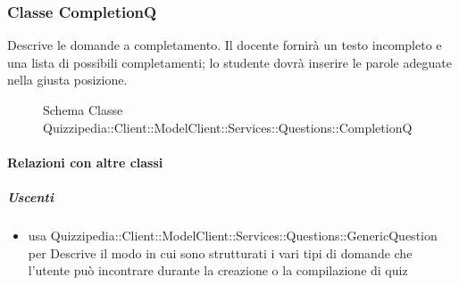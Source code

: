 \subsubsection{Classe CompletionQ}
Descrive le domande a completamento. Il docente fornirà un testo incompleto e una lista di possibili completamenti; lo studente dovrà inserire le parole adeguate nella giusta posizione.
\begin{figure}[H]
\centering
\noindent{}
\caption[Schema Classe CompletionQ]{Schema Classe Quizzipedia::Client::ModelClient::Services::Questions::CompletionQ}
\end{figure}
\paragraph{Relazioni con altre classi}
\subparagraph{Uscenti}
\begin{itemize}
\item usa Quizzipedia::Client::ModelClient::Services::Questions::GenericQuestion per Descrive il modo in cui sono strutturati i vari tipi di domande che l'utente può incontrare durante la creazione o la compilazione di quiz
\end{itemize}
